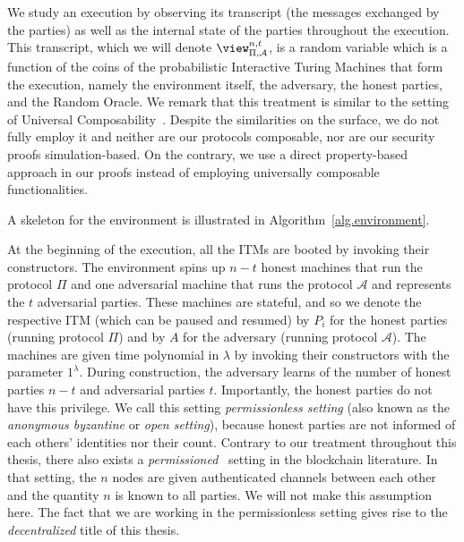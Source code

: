 We study an execution by observing its transcript (the messages exchanged by the
parties) as well as the internal state of the parties throughout the execution.
This transcript, which we will denote $\view_{\Pi,\mathcal{A}}^{n,t}$, is a
random variable which is a function of the coins of the probabilistic
Interactive Turing Machines that form the execution, namely the environment
itself, the adversary, the honest parties, and the Random Oracle. We remark that
this treatment is similar to the setting of Universal Composability~\cite{uc}.
Despite the similarities on the surface, we do not fully employ it and neither
are our protocols composable, nor are our security proofs simulation-based. On
the contrary, we use a direct property-based approach in our proofs instead of
employing universally composable functionalities.

A skeleton for the environment is illustrated in Algorithm~\ref{alg.environment}.



At the beginning of the execution, all the ITMs are booted by invoking their
constructors. The environment spins up $n - t$ honest machines that run
the protocol $\Pi$ and one adversarial machine that runs the protocol
$\mathcal{A}$ and represents the $t$ adversarial parties. These machines are
stateful, and so we denote the respective ITM (which can be paused and resumed)
by $P_i$ for the honest parties (running protocol $\Pi$) and by $A$ for the
adversary (running protocol $\mathcal{A}$). The machines are given time
polynomial in $\lambda$ by invoking their constructors with the parameter
$1^\lambda$. During construction, the adversary
learns of the number of honest parties $n - t$ and adversarial parties $t$.
Importantly, the honest parties do not have this privilege. We
call this setting \emph{permissionless setting} (also
known as the \emph{anonymous byzantine} or \emph{open setting}), because honest
parties are not informed of each others' identities nor their count. Contrary to
our treatment throughout this thesis, there also exists a
\emph{permissioned}~\cite{consensus-sok} setting in the blockchain literature.
In that setting, the $n$ nodes are given authenticated channels between each
other and the quantity $n$ is known to all parties. We will not make this
assumption here. The fact that we are working in the permissionless setting
gives rise to the \emph{decentralized} title of this
thesis.

